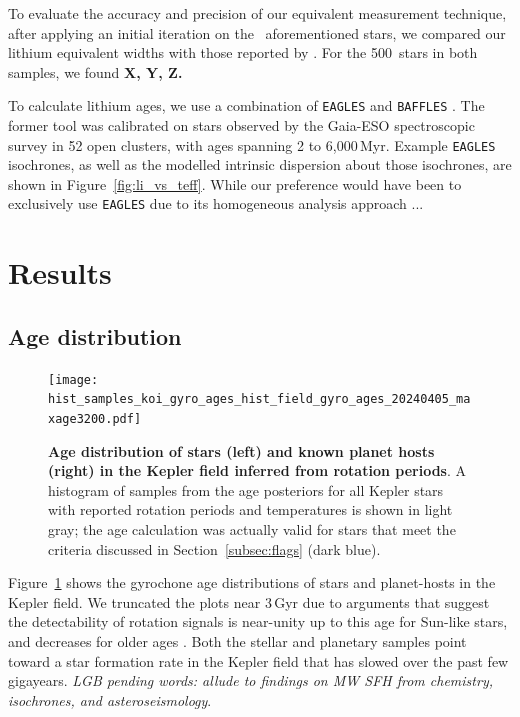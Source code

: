 \documentclass[11pt,twocolumn,tighten]{aastex63}
\newcommand{\nbergeroverlap}{{500}}
\begin{document}
To evaluate the accuracy and precision of our equivalent measurement
technique, after applying an initial iteration on the
\nplhoststarwgyroagewithgrazingandhighruwe\ aforementioned stars,
we compared our lithium equivalent widths
with those reported by \citet{Berger_2018}.
For the \nbergeroverlap\ stars in both samples, we found {\bf X, Y,
Z.}

To calculate lithium ages, we use a combination of \texttt{EAGLES}
\citep{Jeffries_2023} and \texttt{BAFFLES}
\citep{Stanford-Moore_2020}.
The former tool was calibrated on stars observed by the Gaia-ESO
spectroscopic survey in 52 open clusters, with ages spanning 2 to
6{,}000\,Myr.  
Example \texttt{EAGLES} isochrones, as well as the modelled intrinsic dispersion
about those isochrones, are shown in Figure~\ref{fig:li_vs_teff}.
While our preference would have been to exclusively use
\texttt{EAGLES} due to its homogeneous analysis approach ...




\section{Results}
\label{sec:results}


\subsection{Age distribution}

\begin{figure}[!t]
	\begin{center}
		\leavevmode
		\texttt{[image: hist\_samples\_koi\_gyro\_ages\_hist\_field\_gyro\_ages\_20240405\_maxage3200.pdf]}
	\end{center}
	\vspace{-0.6cm}
	\caption{
    {\bf Age distribution of stars (left) and known planet hosts
    (right) in the Kepler field inferred from rotation periods}.
    A histogram of samples from the age posteriors for all Kepler
    stars with reported rotation periods and temperatures is shown in
    light gray;
    the age calculation was actually valid for stars that meet the criteria
    discussed in Section~\ref{subsec:flags} (dark blue).
		\label{fig:hist_tgyro}
	}
\end{figure}

Figure~\ref{fig:hist_tgyro} shows the gyrochone age distributions of
stars and planet-hosts in the Kepler field.
We truncated the plots near $3$\,Gyr due to arguments that suggest the
detectability of rotation signals is near-unity up to this age for
Sun-like stars, and decreases for older ages
\citep{2022ApJ...937...94M}.
Both the stellar and planetary samples point toward a star formation
rate in the Kepler field that has slowed over the past few gigayears.
{\it LGB pending words: allude to findings on MW SFH from chemistry,
isochrones, and asteroseismology}.
\end{document}
